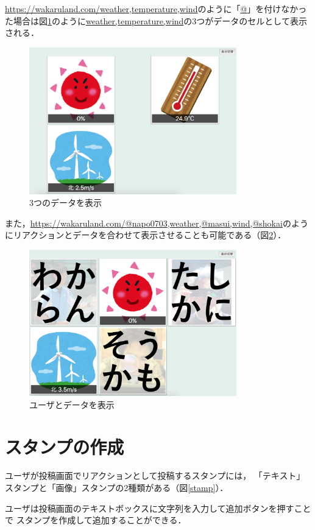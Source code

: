 \url{https://wakaruland.com/weather,temperature,wind}のように「\url{@}」を付けなかった場合は図\ref{w_t_w}のように\url{weather,temperature,wind}の3つがデータのセルとして表示される．

\begin{figure}[h]
\centering
\includegraphics[width=9cm]{images/w_t_w.png}
\caption{3つのデータを表示}
\label{w_t_w}
\end{figure}

また，\url{https://wakaruland.com/@napo0703,weather,@masui,wind,@shokai}のようにリアクションとデータを合わせて表示させることも可能である（図\ref{n_w_m_w_s}）．

\begin{figure}[h]
\centering
\includegraphics[width=9cm]{images/n_w_m_w_s.png}
\caption{ユーザとデータを表示}
\label{n_w_m_w_s}
\end{figure}

\section{スタンプの作成}
ユーザが投稿画面でリアクションとして投稿するスタンプには，
「テキスト」スタンプと「画像」スタンプの2種類がある（図\ref{stamp}）．

ユーザは投稿画面のテキストボックスに文字列を入力して追加ボタンを押すことで
スタンプを作成して追加することができる．

